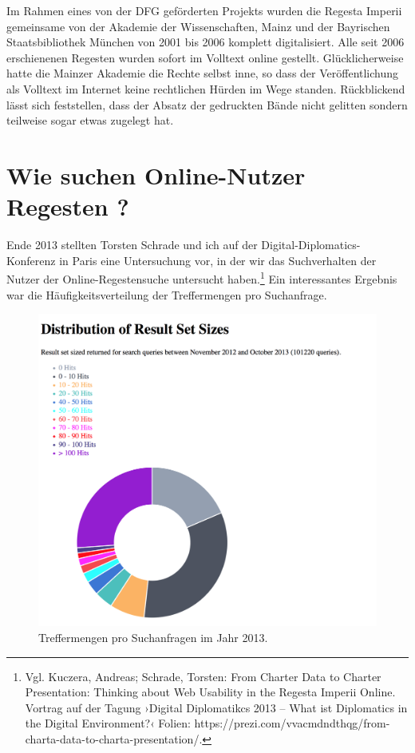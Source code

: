 \documentclass[ngerman,]{scrreprt}
\begin{document}
Im Rahmen eines von der DFG geförderten Projekts wurden die Regesta Imperii gemeinsame von der Akademie der Wissenschaften, Mainz und der Bayrischen Staatsbibliothek München von 2001 bis 2006 komplett digitalisiert. Alle seit 2006 erschienenen Regesten wurden sofort im Volltext online gestellt. Glücklicherweise hatte die Mainzer Akademie die Rechte selbst inne, so dass der Veröffentlichung als Volltext im Internet keine rechtlichen Hürden im Wege standen. Rückblickend lässt sich feststellen, dass der Absatz der gedruckten Bände nicht gelitten sondern teilweise sogar etwas zugelegt hat.

\section{Wie suchen Online-Nutzer Regesten ?}\label{wie-suchen-online-nutzer-regesten}

Ende 2013 stellten Torsten Schrade und ich auf der Digital-Diplomatics-Konferenz in Paris eine Untersuchung vor, in der wir das Suchverhalten der Nutzer der Online-Regestensuche untersucht haben.\footnote{Vgl. Kuczera, Andreas; Schrade, Torsten: From Charter Data to Charter Presentation: Thinking about Web Usability in the Regesta Imperii Online. Vortrag auf der Tagung ›Digital Diplomatikcs 2013 -- What ist Diplomatics in the Digital Environment?‹ Folien: https://prezi.com/vvacmdndthqg/from-charta-data-to-charta-presentation/.} Ein interessantes Ergebnis war die Häufigkeitsverteilung der Treffermengen pro Suchanfrage.

\begin{figure}
\centering
\includegraphics{Bilder/2012-Nutzungsformen_der_RI.png}
\caption{Treffermengen pro Suchanfragen im Jahr 2013.}
\end{figure}
\end{document}
